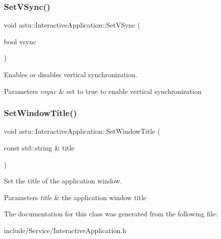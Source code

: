 \subsubsection{\texorpdfstring{Set\+V\+Sync()}{SetVSync()}}
{\footnotesize\ttfamily void astu\+::\+Interactive\+Application\+::\+Set\+V\+Sync (\begin{DoxyParamCaption}\item[{bool}]{vsync }\end{DoxyParamCaption})}

Enables or disables vertical synchronization.


\begin{DoxyParams}{Parameters}
{\em vsync} & set to {\ttfamily true} to enable vertical synchronization \\
\hline
\end{DoxyParams}
\mbox{\label{classastu_1_1InteractiveApplication_a8964c8cb3ae5c445023cc2cc0caefe7a}} 
\subsubsection{\texorpdfstring{Set\+Window\+Title()}{SetWindowTitle()}}
{\footnotesize\ttfamily void astu\+::\+Interactive\+Application\+::\+Set\+Window\+Title (\begin{DoxyParamCaption}\item[{const std\+::string \&}]{title }\end{DoxyParamCaption})}

Set the title of the application window.


\begin{DoxyParams}{Parameters}
{\em title} & the application window title \\
\hline
\end{DoxyParams}


The documentation for this class was generated from the following file\+:\begin{DoxyCompactItemize}
\item 
include/\+Service/Interactive\+Application.\+h\end{DoxyCompactItemize}
